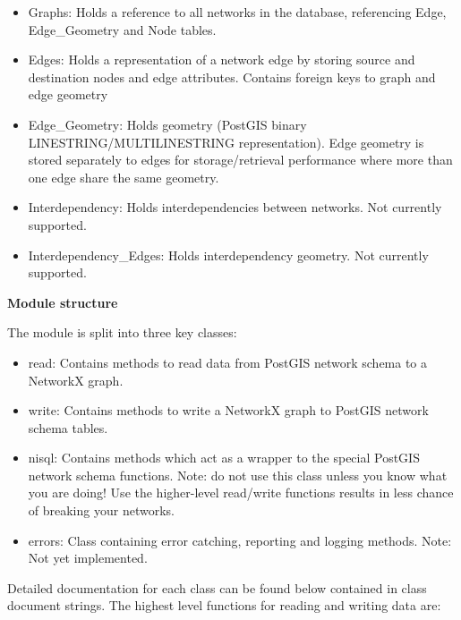 \begin{itemize}
\setlength{\parskip}{0.6ex}
  \item Graphs: Holds a reference to all networks in the database, referencing 
    Edge, Edge\_Geometry and Node tables.

  \item Edges: Holds a representation of a network edge by storing source and 
    destination nodes and edge attributes. Contains foreign keys to graph 
    and edge geometry

  \item Edge\_Geometry: Holds geometry (PostGIS binary 
    LINESTRING/MULTILINESTRING representation). Edge geometry is stored 
    separately to edges for storage/retrieval performance where more than 
    one edge share the same geometry.

  \item Interdependency: Holds interdependencies between networks. Not 
    currently supported.

  \item Interdependency\_Edges: Holds interdependency geometry. Not currently 
    supported.

\end{itemize}

\textbf{Module structure    }

The module is split into three key classes:

\begin{itemize}
\setlength{\parskip}{0.6ex}
  \item read: Contains methods to read data from PostGIS network schema to a 
    NetworkX graph.

  \item write: Contains methods to write a NetworkX graph to PostGIS network 
    schema tables.

  \item nisql: Contains methods which act as a wrapper to the special PostGIS 
    network schema functions. Note: do not use this class unless you know 
    what you are doing! Use the higher-level read/write functions results 
    in less chance of breaking your networks.

  \item errors: Class containing error catching, reporting and logging methods.
    Note: Not yet implemented.

\end{itemize}

Detailed documentation for each class can be found below contained in class
document strings. The highest level functions for reading and writing data 
are:

